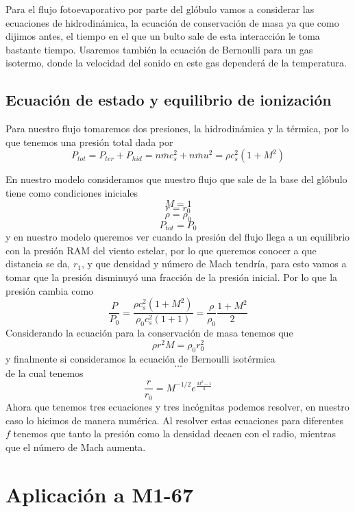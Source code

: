 \documentclass{book}
\begin{document}
Para el flujo fotoevaporativo por parte del glóbulo vamos a considerar las ecuaciones de hidrodinámica, la ecuación de conservación de masa ya que como dijimos antes, el tiempo en el que un bulto sale de esta interacción le toma bastante tiempo. Usaremos también la ecuación de Bernoulli para un gas isotermo, donde la velocidad del sonido en este gas dependerá de la temperatura.


\section{Ecuación de estado y equilibrio de ionización}

Para nuestro flujo tomaremos dos presiones, la hidrodinámica y la térmica, por lo que tenemos una presión total dada por
\[P_{tot}=P_{ter}+P_{hid}=n\bar{m}c_s^2+n\bar{m}u^2=\rho c_s^2(1+M^2)\]

En nuestro modelo consideramos que nuestro flujo que sale de la base del glóbulo tiene como condiciones iniciales
\[M=1\]
\[r=r_0\]
\[\rho=\rho_0\]
\[P_{tot}=P_0\]
y en nuestro modelo queremos ver cuando la presión del flujo llega a un equilibrio con la presión RAM del viento estelar, por lo que queremos conocer a que distancia se da, $r_1$, y que densidad y número de Mach tendría, para esto vamos a tomar que la presión disminuyó una fracción de la presión inicial. Por lo que la presión cambia como 
\[\frac{P}{P_0}=\frac{\rho c_s^2(1+M^2)}{\rho_0 c_s^2(1+1)}=\frac{\rho}{\rho_0}\frac{1+M^2}{2}\]
Considerando la ecuación para la conservación de masa tenemos que
\[\rho r^2M	=\rho_0 r_0^2\]
y finalmente si consideramos la ecuación de Bernoulli isotérmica 
\[\dots\]
de la cual tenemos 
\[\frac{r}{r_0}=M^{-1/2}e^{\frac{M^2-1}{4}}\]
Ahora que tenemos tres ecuaciones y tres incógnitas podemos resolver, en nuestro caso lo hicimos de manera numérica. Al resolver estas ecuaciones para diferentes $f$ tenemos que tanto la presión como la densidad decaen con el radio, mientras que el número de Mach aumenta.







\chapter{Aplicación a M1-67}
\end{document}
